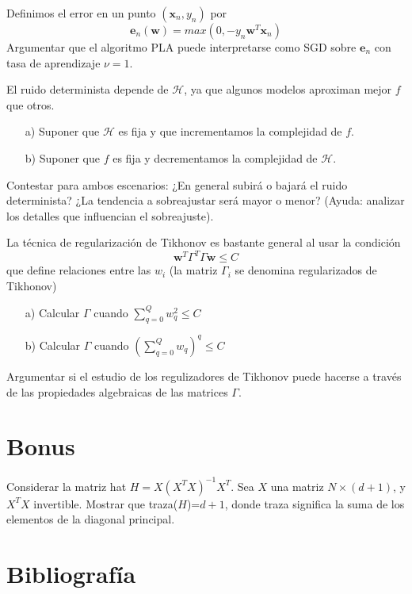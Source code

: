 \documentclass[12pt]{article}
\theoremstyle{definition}
\begin{document}
\begin{pregunta}
Definimos el error en un punto $(\mathbf{x}_n,y_n)$ por 
\[		\mathbf{e}_n(\mathbf{w})=max(0,-y_n\mathbf{w}^T\mathbf{x}_n)		\]
Argumentar que el algoritmo PLA puede interpretarse como SGD sobre $\mathbf{e}_n$ con tasa de aprendizaje $\nu=1$.\\


\end{pregunta}

\begin{pregunta}
El ruido determinista depende de $\mathcal{H}$, ya que algunos modelos aproximan mejor $f$ que otros.
\begin{enumerate}
\item[a)] Suponer que $\mathcal{H}$ es fija y que incrementamos la complejidad de $f$.
\item[b)] Suponer que $f$ es fija y decrementamos la complejidad de $\mathcal{H}$.
\end{enumerate}
Contestar para ambos escenarios: ¿En general subirá o bajará el ruido determinista? ¿La tendencia a sobreajustar será mayor o menor? (Ayuda: analizar los detalles que influencian el sobreajuste).\\


\end{pregunta}

\begin{pregunta}
La técnica de regularización de Tikhonov es bastante general al usar la condición
\[		\mathbf{w}^T\Gamma^T\Gamma\mathbf{w} \leq C		\]
que define relaciones entre las $w_i$ (la matriz $\Gamma_i$ se denomina regularizados de Tikhonov)
\begin{enumerate}
\item[a)] Calcular $\Gamma$ cuando $\sum_{q=0}^Qw_q^2 \leq C$
\item[b)] Calcular $\Gamma$ cuando $(\sum_{q=0}^Qw_q)^q \leq C$
\end{enumerate}
Argumentar si el estudio de los regulizadores de Tikhonov puede hacerse a través de las propiedades algebraicas de las matrices $\Gamma$.\\


\end{pregunta}

\section{Bonus}
\begin{pregunta}
Considerar la matriz hat $H=X(X^TX)^{-1}X^T$. Sea $X$ una matriz $N \times (d+1)$, y $X^TX$ invertible. Mostrar que traza($H$)=$d+1$, donde traza significa la suma de los elementos de la diagonal principal.

\end{pregunta}

\section{Bibliografía}
\end{document}

